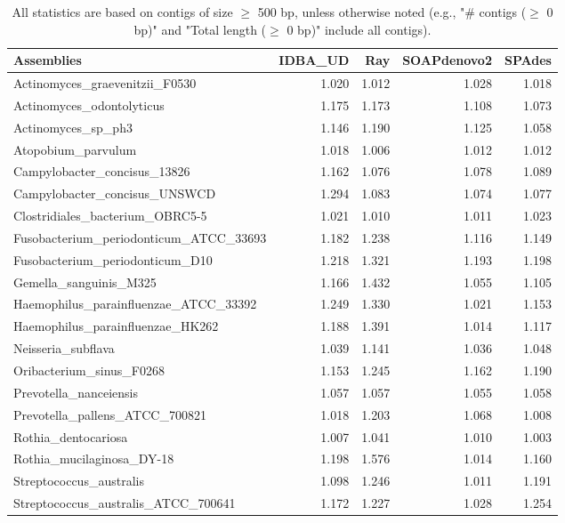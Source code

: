 \documentclass[12pt,a4paper]{article}
\begin{document}
\begin{table}[ht]
\begin{center}
\caption{All statistics are based on contigs of size $\geq$ 500 bp, unless otherwise noted (e.g., "\# contigs ($\geq$ 0 bp)" and "Total length ($\geq$ 0 bp)" include all contigs).}
\begin{tabular}{|l*{4}{|r}|}
\hline
Assemblies & IDBA\_UD & Ray & SOAPdenovo2 & SPAdes \\ \hline
Actinomyces\_graevenitzii\_F0530 & 1.020 & 1.012 & 1.028 & 1.018 \\ \hline
Actinomyces\_odontolyticus & 1.175 & 1.173 & 1.108 & 1.073 \\ \hline
Actinomyces\_sp\_ph3 & 1.146 & 1.190 & 1.125 & 1.058 \\ \hline
Atopobium\_parvulum & 1.018 & 1.006 & 1.012 & 1.012 \\ \hline
Campylobacter\_concisus\_13826 & 1.162 & 1.076 & 1.078 & 1.089 \\ \hline
Campylobacter\_concisus\_UNSWCD & 1.294 & 1.083 & 1.074 & 1.077 \\ \hline
Clostridiales\_bacterium\_OBRC5-5 & 1.021 & 1.010 & 1.011 & 1.023 \\ \hline
Fusobacterium\_periodonticum\_ATCC\_33693 & 1.182 & 1.238 & 1.116 & 1.149 \\ \hline
Fusobacterium\_periodonticum\_D10 & 1.218 & 1.321 & 1.193 & 1.198 \\ \hline
Gemella\_sanguinis\_M325 & 1.166 & 1.432 & 1.055 & 1.105 \\ \hline
Haemophilus\_parainfluenzae\_ATCC\_33392 & 1.249 & 1.330 & 1.021 & 1.153 \\ \hline
Haemophilus\_parainfluenzae\_HK262 & 1.188 & 1.391 & 1.014 & 1.117 \\ \hline
Neisseria\_subflava & 1.039 & 1.141 & 1.036 & 1.048 \\ \hline
Oribacterium\_sinus\_F0268 & 1.153 & 1.245 & 1.162 & 1.190 \\ \hline
Prevotella\_nanceiensis & 1.057 & 1.057 & 1.055 & 1.058 \\ \hline
Prevotella\_pallens\_ATCC\_700821 & 1.018 & 1.203 & 1.068 & 1.008 \\ \hline
Rothia\_dentocariosa & 1.007 & 1.041 & 1.010 & 1.003 \\ \hline
Rothia\_mucilaginosa\_DY-18 & 1.198 & 1.576 & 1.014 & 1.160 \\ \hline
Streptococcus\_australis & 1.098 & 1.246 & 1.011 & 1.191 \\ \hline
Streptococcus\_australis\_ATCC\_700641 & 1.172 & 1.227 & 1.028 & 1.254 \\ \hline

\end{tabular}
\end{center}
\end{table}
\end{document}
